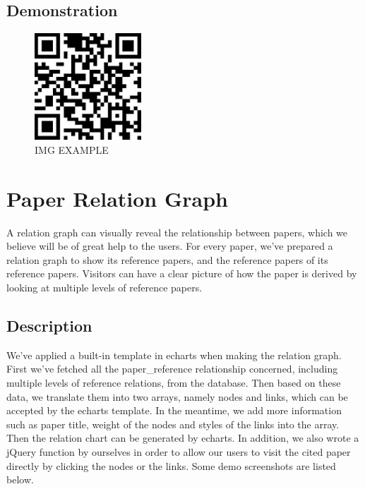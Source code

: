 \documentclass{book}
\begin{document}
\subsection{Demonstration}

\begin{figure}[H]
\centering
\includegraphics[height=4.0cm,width=4.0cm]{img/fsh_1.jpg}
\caption{IMG EXAMPLE}
\end{figure}



\section {Paper Relation Graph}

A relation graph can visually reveal the relationship between papers, which we believe will be of great help to the users. For every paper, we've prepared a relation graph to show its reference papers, and the reference papers of its reference papers. Visitors can have a clear picture of how the paper is derived by looking at multiple levels of reference papers.

\subsection{Description}

We've applied a built-in template in echarts when making the relation graph. First we've fetched all the paper\_reference relationship concerned, including multiple levels of reference relations, from the database. Then based on these data, we translate them into two arrays, namely nodes and links, which can be accepted by the echarts template. In the meantime, we add more information such as paper title, weight of the nodes and styles of the links into the array. Then the relation chart can be generated by echarts. In addition, we also wrote a jQuery function by ourselves in order to allow our users to visit the cited paper directly by clicking the nodes or the links. Some demo screenshots are listed below.
\end{document}

